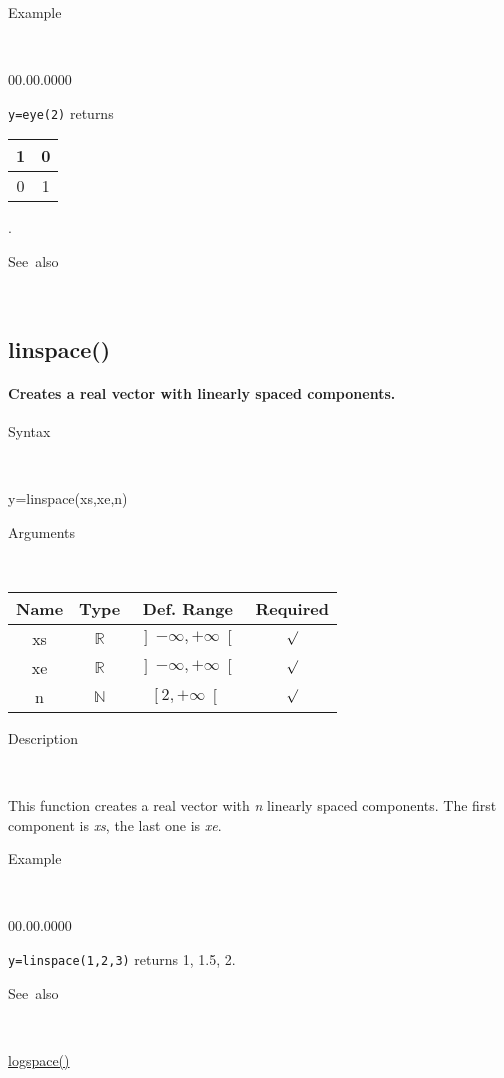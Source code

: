 \begin{description}
\item [Example]~
\end{description}
\begin{lyxlist}{00.00.0000}
\item [\texttt{y=eye(2)}]returns \begin{tabular}{|c|c|}
\hline 
1&
0\tabularnewline
\hline
0&
1\tabularnewline
\hline
\end{tabular}.
\end{lyxlist}
\begin{description}
\item [See~also]~
\end{description}

\newpage
\subsection*{\hypertarget{linspace}{}{\Large linspace()}}


\paragraph{\textmd{\label{par:linspace}}Creates a real vector with linearly
spaced components.}

\begin{description}
\item [Syntax]~
\end{description}
y=linspace(xs,xe,n)

\begin{description}
\item [Arguments]~
\end{description}
\begin{tabular}{|c|c|c|c|}
\hline 
Name&
Type&
Def. Range&
Required\tabularnewline
\hline
\hline 
xs&
$\mathbb{R}$&
$\left]-\infty,+\infty\right[$&
$\surd$\tabularnewline
\hline
xe&
$\mathbb{R}$&
$\left]-\infty,+\infty\right[$&
$\surd$\tabularnewline
\hline
n&
$\mathbb{N}$&
$\left[2,+\infty\right[$&
$\surd$\tabularnewline
\hline
\end{tabular}

\begin{description}
\item [Description]~
\end{description}
This function creates a real vector with \textit{n} linearly spaced
components. The first component is \textit{xs}, the last one is \textit{xe}.

\begin{description}
\item [Example]~
\end{description}
\begin{lyxlist}{00.00.0000}
\item [\texttt{y=linspace(1,2,3)}]returns 1, 1.5, 2.
\end{lyxlist}
\begin{description}
\item [See~also]~
\end{description}
\textcolor{blue}{\hyperlink{logspace}{logspace()}}


